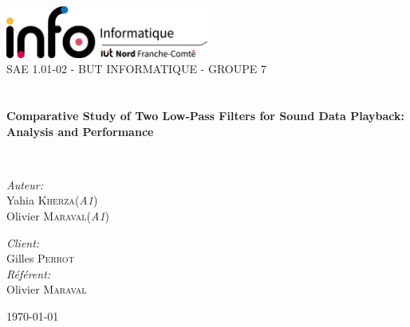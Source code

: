 \begin{titlepage}
\begin{center}

\includegraphics[width=0.5\textwidth]{./images/InfoLogoQuadriH.png}~\\[1cm]

\textsc{\LARGE SAE 1.01-02 - BUT INFORMATIQUE - GROUPE 7 }\\[1.5cm]

\textsc{\Large }\\[0.5cm]

\HRule \\[0.4cm]

{\huge \bfseries Comparative Study of Two Low-Pass Filters for Sound Data Playback: Analysis and Performance\\[0.4cm] }

\HRule \\[1.5cm]

\begin{minipage}{0.4\textwidth}
\begin{flushleft} \large
\emph{Auteur:}\\
Yahia \textsc{Kherza}(\textit{A1})\\
Olivier \textsc{Maraval}(\textit{A1})\\
\end{flushleft}
\end{minipage}
\begin{minipage}{0.4\textwidth}
\begin{flushright} \large
\emph{Client:} \\
Gilles \textsc{Perrot}\\
\emph{Référent:} \\
Olivier \textsc{Maraval}
\end{flushright}
\end{minipage}

\vfill

{\large \today}

\end{center}
\end{titlepage}